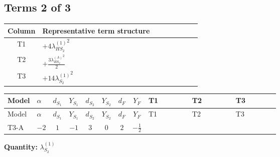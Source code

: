 \documentclass[8pt]{article}
\begin{document}
\begin{landscape}
\subsection*{Terms 2 of 3}
\begin{center}
\begin{tabular}{@{}c >{\raggedright\arraybackslash}p{0.82\linewidth}@{}}
\toprule
Column & Representative term structure \\
\midrule
T1 & \(\displaystyle +4 {\lambda_{HS_2}^{(1)}}^2\) \\
\midrule
T2 & \(\displaystyle +\frac{3 {\lambda_{HS_2}^{(A)}}^2}{2}\) \\
\midrule
T3 & \(\displaystyle +14 {\lambda_{S_2}^{(1)}}^2\) \\
\midrule
\bottomrule
\end{tabular}
\end{center}
\smallskip
\tiny
\begin{longtable}{@{}llcccccc >{\raggedright\arraybackslash}p{0.21\linewidth} >{\raggedright\arraybackslash}p{0.21\linewidth} >{\raggedright\arraybackslash}p{0.21\linewidth}@{}}
\toprule
Model & $\alpha$ & $d_{S_1}$ & $Y_{S_1}$ & $d_{S_2}$ & $Y_{S_2}$ & $d_F$ & $Y_F$ & T1 & T2 & T3 \\
\midrule
\endfirsthead
\toprule
Model & $\alpha$ & $d_{S_1}$ & $Y_{S_1}$ & $d_{S_2}$ & $Y_{S_2}$ & $d_F$ & $Y_F$ & T1 & T2 & T3 \\
\midrule
\endhead
T3-A & $-2$ & $1$ & $-1$ & $3$ & $0$ & $2$ & $-\frac{1}{2}$ & \scriptsize\adjustbox{max width=\linewidth}{$\begin{gathered} +4 {\lambda_{HS_2}^{(1)}}^2\end{gathered}$} & \scriptsize\adjustbox{max width=\linewidth}{$\begin{gathered} +\frac{3 {\lambda_{HS_2}^{(A)}}^2}{2}\end{gathered}$} & \scriptsize\adjustbox{max width=\linewidth}{$\begin{gathered} +14 {\lambda_{S_2}^{(1)}}^2\end{gathered}$} \\
\midrule
\bottomrule
\end{longtable}
\clearpage
\noindent\textbf{Quantity: }$\lambda_{S_2}^{(1)}$\par\smallskip

\end{landscape}
\end{document}
